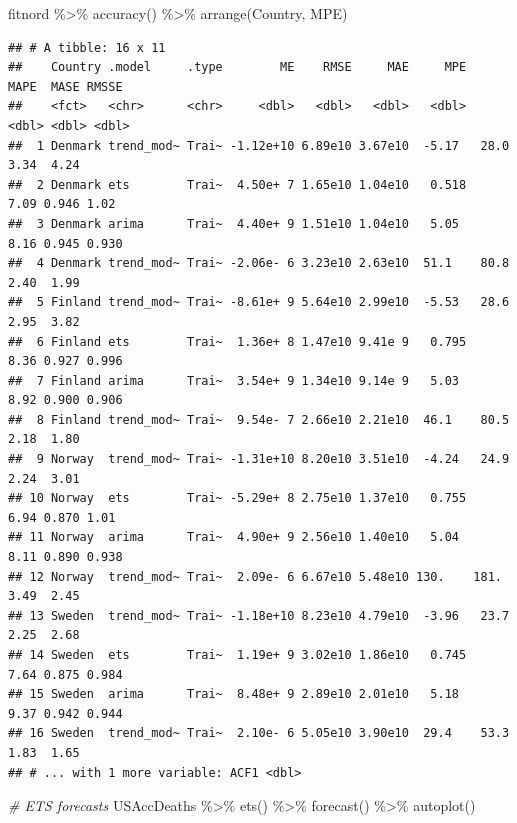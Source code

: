 \documentclass[
]{book}
\newenvironment{Shaded}{\begin{snugshade}}{\end{snugshade}}
\newcommand{\CommentTok}[1]{\textcolor[rgb]{0.56,0.35,0.01}{\textit{#1}}}
\newcommand{\FunctionTok}[1]{\textcolor[rgb]{0.00,0.00,0.00}{#1}}
\newcommand{\NormalTok}[1]{#1}
\newcommand{\SpecialCharTok}[1]{\textcolor[rgb]{0.00,0.00,0.00}{#1}}
\begin{document}
\begin{Shaded}
\begin{Highlighting}[]
\NormalTok{fitnord }\SpecialCharTok{\%\textgreater{}\%}
  \FunctionTok{accuracy}\NormalTok{() }\SpecialCharTok{\%\textgreater{}\%}
  \FunctionTok{arrange}\NormalTok{(Country, MPE)}
\end{Highlighting}
\end{Shaded}

\begin{verbatim}
## # A tibble: 16 x 11
##    Country .model     .type        ME    RMSE     MAE     MPE   MAPE  MASE RMSSE
##    <fct>   <chr>      <chr>     <dbl>   <dbl>   <dbl>   <dbl>  <dbl> <dbl> <dbl>
##  1 Denmark trend_mod~ Trai~ -1.12e+10 6.89e10 3.67e10  -5.17   28.0  3.34  4.24 
##  2 Denmark ets        Trai~  4.50e+ 7 1.65e10 1.04e10   0.518   7.09 0.946 1.02 
##  3 Denmark arima      Trai~  4.40e+ 9 1.51e10 1.04e10   5.05    8.16 0.945 0.930
##  4 Denmark trend_mod~ Trai~ -2.06e- 6 3.23e10 2.63e10  51.1    80.8  2.40  1.99 
##  5 Finland trend_mod~ Trai~ -8.61e+ 9 5.64e10 2.99e10  -5.53   28.6  2.95  3.82 
##  6 Finland ets        Trai~  1.36e+ 8 1.47e10 9.41e 9   0.795   8.36 0.927 0.996
##  7 Finland arima      Trai~  3.54e+ 9 1.34e10 9.14e 9   5.03    8.92 0.900 0.906
##  8 Finland trend_mod~ Trai~  9.54e- 7 2.66e10 2.21e10  46.1    80.5  2.18  1.80 
##  9 Norway  trend_mod~ Trai~ -1.31e+10 8.20e10 3.51e10  -4.24   24.9  2.24  3.01 
## 10 Norway  ets        Trai~ -5.29e+ 8 2.75e10 1.37e10   0.755   6.94 0.870 1.01 
## 11 Norway  arima      Trai~  4.90e+ 9 2.56e10 1.40e10   5.04    8.11 0.890 0.938
## 12 Norway  trend_mod~ Trai~  2.09e- 6 6.67e10 5.48e10 130.    181.   3.49  2.45 
## 13 Sweden  trend_mod~ Trai~ -1.18e+10 8.23e10 4.79e10  -3.96   23.7  2.25  2.68 
## 14 Sweden  ets        Trai~  1.19e+ 9 3.02e10 1.86e10   0.745   7.64 0.875 0.984
## 15 Sweden  arima      Trai~  8.48e+ 9 2.89e10 2.01e10   5.18    9.37 0.942 0.944
## 16 Sweden  trend_mod~ Trai~  2.10e- 6 5.05e10 3.90e10  29.4    53.3  1.83  1.65 
## # ... with 1 more variable: ACF1 <dbl>
\end{verbatim}

\begin{Shaded}
\begin{Highlighting}[]
\CommentTok{\# ETS forecasts}
\NormalTok{USAccDeaths }\SpecialCharTok{\%\textgreater{}\%}
  \FunctionTok{ets}\NormalTok{() }\SpecialCharTok{\%\textgreater{}\%}
  \FunctionTok{forecast}\NormalTok{() }\SpecialCharTok{\%\textgreater{}\%}
  \FunctionTok{autoplot}\NormalTok{()}
\end{Highlighting}
\end{Shaded}
\end{document}
